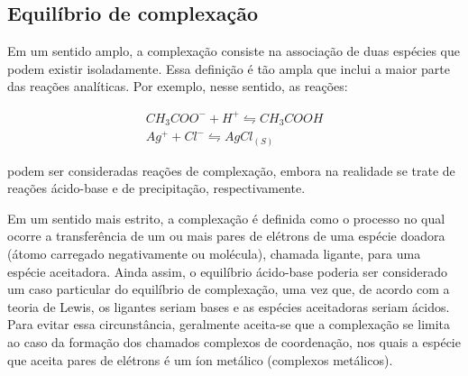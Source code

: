 \subsection*{Equilíbrio de complexação}

Em um sentido amplo, a complexação consiste na associação de duas espécies que podem existir isoladamente. Essa definição é tão ampla que inclui a maior parte das reações analíticas. Por exemplo, nesse sentido, as reações:

\begin{gather}
    CH_3COO^- + H^+ \leftrightharpoons CH_3COOH \\
    Ag^+ + Cl^- \leftrightharpoons AgCl_{(S)}
\end{gather}

podem ser consideradas reações de complexação, embora na realidade se trate de reações ácido-base e de precipitação, respectivamente.

Em um sentido mais estrito, a complexação é definida como o processo no qual ocorre a transferência de um ou mais pares de elétrons de uma espécie doadora (átomo carregado negativamente ou molécula), chamada ligante, para uma espécie aceitadora. Ainda assim, o equilíbrio ácido-base poderia ser considerado um caso particular do equilíbrio de complexação, uma vez que, de acordo com a teoria de Lewis, os ligantes seriam bases e as espécies aceitadoras seriam ácidos. Para evitar essa circunstância, geralmente aceita-se que a complexação se limita ao caso da formação dos chamados complexos de coordenação, nos quais a espécie que aceita pares de elétrons é um íon metálico (complexos metálicos).

